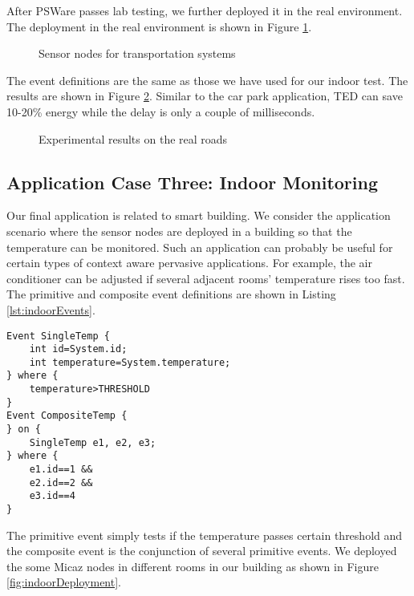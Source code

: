 After PSWare passes lab testing, we further deployed it in the real environment. The deployment in the real environment is shown in Figure \ref{fig:itsSensor}.

\begin{figure}
\centering
{}
\caption{Sensor nodes for transportation systems}
\label{fig:itsSensor}
\end{figure}

The event definitions are the same as those we have used for our indoor test. The results are shown in Figure \ref{fig:itsResults}. Similar to the car park application, TED can save 10-20\% energy while the delay is only a couple of milliseconds.
 
\begin{figure}
\centering
{}
\caption{Experimental results on the real roads}
\label{fig:itsResults}
\end{figure}

\subsection{Application Case Three: Indoor Monitoring}
Our final application is related to smart building. We consider the application scenario where the sensor nodes are deployed in a building so that the temperature can be monitored. Such an application can probably be useful for certain types of context aware pervasive applications. For example, the air conditioner can be adjusted if several adjacent rooms' temperature rises too fast. The primitive and composite event definitions are shown in Listing \ref{lst:indoorEvents}.

\begin{lstlisting}[caption=Event definition for indoor monitoring, label=lst:indoorEvents]
Event SingleTemp {
	int id=System.id;
	int temperature=System.temperature;
} where {
	temperature>THRESHOLD
}
Event CompositeTemp {
} on {
	SingleTemp e1, e2, e3;
} where {
	e1.id==1 &&
	e2.id==2 &&
	e3.id==4
}
\end{lstlisting}

The primitive event simply tests if the temperature passes certain threshold and the composite event is the conjunction of several primitive events. We deployed the some Micaz nodes in different rooms in our building as shown in Figure \ref{fig:indoorDeployment}.

